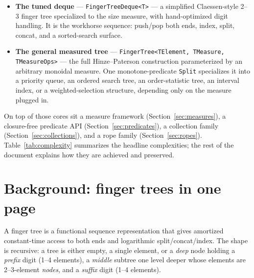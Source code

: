 \documentclass[11pt]{article}
\newcommand{\cs}[1]{\lstinline|#1|}
\begin{document}
\begin{itemize}[leftmargin=1.4em]
  \item \textbf{The tuned deque} --- \cs{FingerTreeDeque<T>} --- a simplified Claessen-style 2--3 finger
    tree specialized to the size measure, with hand-optimized digit handling. It is the workhorse
    sequence: push/pop both ends, index, split, concat, and a sorted-search surface.
  \item \textbf{The general measured tree} --- \cs{FingerTree<TElement, TMeasure, TMeasureOps>} --- the
    full Hinze--Paterson construction parameterized by an arbitrary monoidal measure. One
    monotone-predicate \cs{Split} specializes it into a priority queue, an ordered search tree, an
    order-statistic tree, an interval index, or a weighted-selection structure, depending only on the
    measure plugged in.
\end{itemize}

On top of those cores sit a measure framework (Section~\ref{sec:measures}), a closure-free predicate API
(Section~\ref{sec:predicates}), a collection family (Section~\ref{sec:collections}), and a rope family
(Section~\ref{sec:ropes}). Table~\ref{tab:complexity} summarizes the headline complexities; the rest of
the document explains how they are achieved and preserved.

\section{Background: finger trees in one page}
\label{sec:background}

A finger tree is a functional sequence representation that gives amortized constant-time access to both
ends and logarithmic split/concat/index. The shape is recursive: a tree is either empty, a single
element, or a \emph{deep} node holding a \emph{prefix} digit (1--4 elements), a \emph{middle} subtree
one level deeper whose elements are 2--3-element \emph{nodes}, and a \emph{suffix} digit (1--4 elements).
\end{document}
